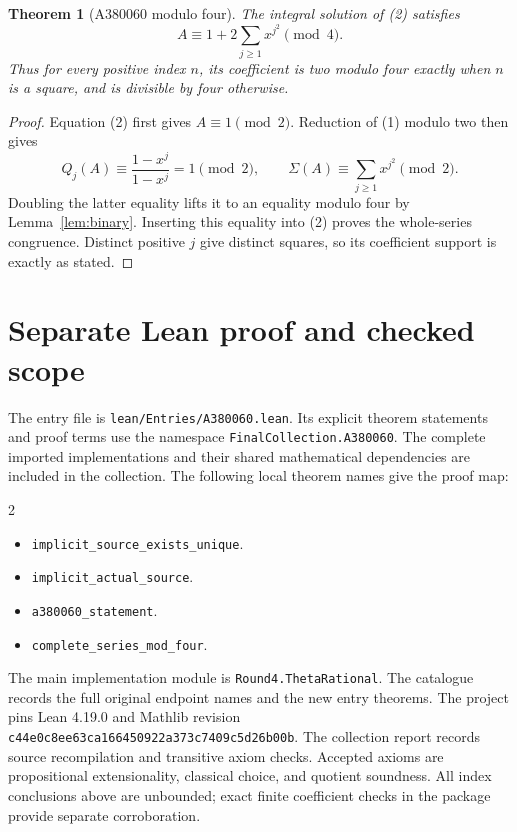 \documentclass[11pt,a4paper]{article}
\newtheorem{theorem}{Theorem}[section]
\theoremstyle{remark}
\begin{document}
\begin{theorem}[A380060 modulo four]\label{thm:theta060}
The integral solution of (2) satisfies
\[
 A\equiv1+2\sum_{j\ge1}x^{j^2}\pmod4.
\]
Thus for every positive index $n$, its coefficient is two modulo four
exactly when $n$ is a square, and is divisible by four otherwise.
\end{theorem}

\begin{proof}
Equation (2) first gives $A\equiv1\pmod2$. Reduction of (1) modulo two
then gives
\[
 Q_j(A)\equiv\frac{1-x^j}{1-x^j}=1\pmod2,
 \qquad
 \Sigma(A)\equiv\sum_{j\ge1}x^{j^2}\pmod2.
\]
Doubling the latter equality lifts it to an equality modulo four by
Lemma~\ref{lem:binary}. Inserting this equality into (2) proves the
whole-series congruence. Distinct positive $j$ give distinct squares,
so its coefficient support is exactly as stated.
\end{proof}


\section{Separate Lean proof and checked scope}

The entry file is \nolinkurl{lean/Entries/A380060.lean}. Its explicit
theorem statements and proof terms use the namespace
\nolinkurl{FinalCollection.A380060}. The complete imported implementations
and their shared mathematical dependencies are included in the collection.
The following local theorem names give the proof map:

\begin{multicols}{2}\raggedright\begin{itemize}\setlength{\itemsep}{2pt}\setlength{\parsep}{0pt}
\item \nolinkurl{implicit_source_exists_unique}.
\item \nolinkurl{implicit_actual_source}.
\item \nolinkurl{a380060_statement}.
\item \nolinkurl{complete_series_mod_four}.
\end{itemize}\end{multicols}

The main implementation module is \nolinkurl{Round4.ThetaRational}.
The catalogue records the full original endpoint names and the new entry
theorems. The project pins Lean 4.19.0 and Mathlib revision
\nolinkurl{c44e0c8ee63ca166450922a373c7409c5d26b00b}. The collection
report records source recompilation and transitive axiom checks. Accepted
axioms are propositional extensionality, classical choice, and quotient
soundness. All index conclusions above are unbounded; exact finite
coefficient checks in the package provide separate corroboration.
\end{document}
